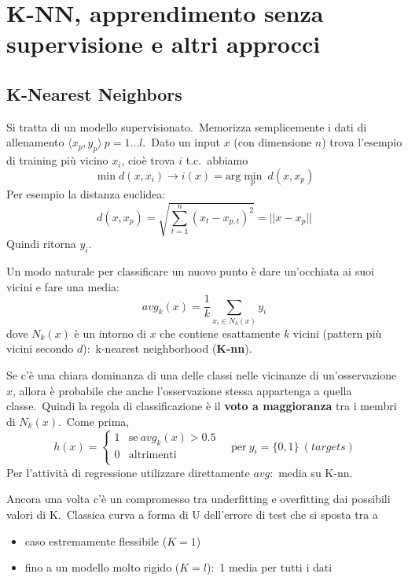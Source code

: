 \chapter{K-NN, apprendimento senza supervisione e altri approcci}

\section{K-Nearest Neighbors}

Si tratta di un modello supervisionato.\
Memorizza semplicemente i dati di allenamento $\langle x_p, y_p\rangle\ p = 1\dots l$.\
Dato un input $x$ (con dimensione $n$) trova l'esempio di training più vicino $x_i$, cioè trova $i$ t.c.\ abbiamo \[\min d (x, x_i) \rightarrow i(x) = \mathrm{arg}\min_p\ d (x, x_p)\]
Per esempio la distanza euclidea:
\[d(x,x_p) = \sqrt{\sum_{t=1}^n (x_t -x_{p,t})^2} = ||x-x_p||\]
Quindi ritorna $y_i$.\

Un modo naturale per classificare un nuovo punto è dare un'occhiata ai suoi vicini e fare una media:
\[\mathit{avg}_k (x) = \frac{1}{k} \sum_{x_i \in N_k (x)} y_i\]
dove $N_k (x)$ è un intorno di $x$ che contiene esattamente $k$ vicini (pattern più vicini secondo $d$):\ k-nearest neighborhood (\textbf{K-nn}).

Se c'è una chiara dominanza di una delle classi nelle vicinanze di un'osservazione $x$, allora è probabile che anche l'osservazione stessa appartenga a quella classe.\
Quindi la regola di classificazione è il \textbf{voto a maggioranza} tra i membri di $N_k (x)$.\
Come prima,
\[h(x) = \left\{\begin{array}{ll}
		1 & \mathrm{se}\ \mathit{avg}_k(x) > 0.5 \\
		0 & \mathrm{altrimenti}                  \\
	\end{array}\right.\quad \mathrm{per}\ y_i = \{0,1\}\ (\mathit{targets})\]
Per l'attività di regressione utilizzare direttamente $\mathit{avg}$:\ media su K-nn.

\vspace{12pt}

\noindent Ancora una volta c'è un compromesso tra underfitting e overfitting dai possibili valori di K.\
Classica curva a forma di U dell'errore di test che si sposta tra a
\begin{itemize}
	\item caso estremamente flessibile ($K = 1$)
	\item fino a un modello molto rigido ($K = l$):\ 1 media per tutti i dati
\end{itemize}

